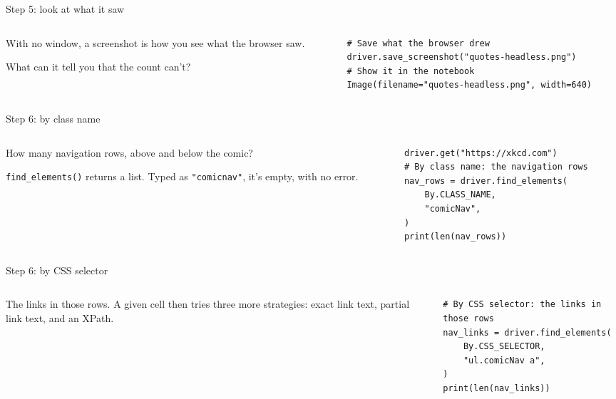 \documentclass[9pt,aspectratio=169]{beamer}
\begin{document}
\begin{frame}[fragile]{Step 5: look at what it saw}
    \begin{columns}[T]
        \begin{column}{0.37\textwidth}
            With no window, a screenshot is how you see what the browser saw.

            \medskip
            What can it tell you that the count can't?
        \end{column}
        \begin{column}{0.6\textwidth}
\begin{lstlisting}[style=lab]
# Save what the browser drew
driver.save_screenshot("quotes-headless.png")
# Show it in the notebook
Image(filename="quotes-headless.png", width=640)
\end{lstlisting}
        \end{column}
    \end{columns}
\end{frame}

\begin{frame}[fragile]{Step 6: by class name}
    \begin{columns}[T]
        \begin{column}{0.37\textwidth}
            How many navigation rows, above and below the comic?

            \medskip
            \texttt{find\_elements()} returns a list. Typed as \texttt{"comicnav"}, it's empty, with no error.
        \end{column}
        \begin{column}{0.6\textwidth}
\begin{lstlisting}[style=lab]
driver.get("https://xkcd.com")
# By class name: the navigation rows
nav_rows = driver.find_elements(
    By.CLASS_NAME,
    "comicNav",
)
print(len(nav_rows))
\end{lstlisting}
        \end{column}
    \end{columns}
\end{frame}

\begin{frame}[fragile]{Step 6: by CSS selector}
    \begin{columns}[T]
        \begin{column}{0.37\textwidth}
            The links in those rows. A given cell then tries three more strategies: exact link text, partial link text, and an XPath.
        \end{column}
        \begin{column}{0.6\textwidth}
\begin{lstlisting}[style=lab]
# By CSS selector: the links in those rows
nav_links = driver.find_elements(
    By.CSS_SELECTOR,
    "ul.comicNav a",
)
print(len(nav_links))
\end{lstlisting}
        \end{column}
    \end{columns}
\end{frame}
\end{document}
